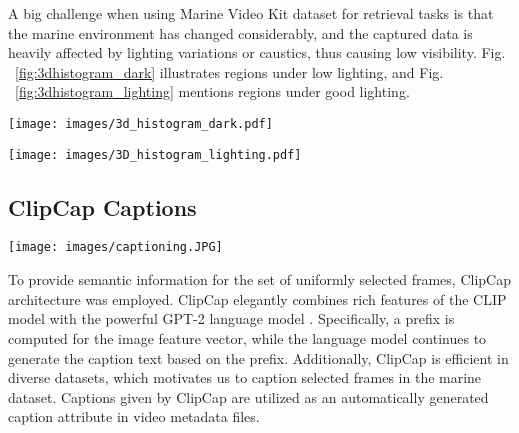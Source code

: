\documentclass[runningheads]{llncs}
\begin{document}
A big challenge when using Marine Video Kit dataset for retrieval tasks is that the marine environment has changed considerably, and the captured data is heavily affected by lighting variations or caustics, thus causing low visibility. Fig. ~\ref{fig:3dhistogram_dark} illustrates regions under low lighting, and Fig. ~\ref{fig:3dhistogram_lighting} mentions regions under good lighting.

\begin{figure*}
\begin{center}
\centering
\texttt{[image: images/3d\_histogram\_dark.pdf]}
\end{center}
  \caption{Illustration of video frame colors present in regions under low illumination using 3D color histograms.}
\label{fig:3dhistogram_dark}
\end{figure*}

\begin{figure*}
\begin{center}
\centering
\texttt{[image: images/3D\_histogram\_lighting.pdf]}
\end{center}
  \caption{Illustration of video frame colors present in regions under good illumination using 3D color histograms.}
\label{fig:3dhistogram_lighting}
\end{figure*}

\subsection{ClipCap Captions}

\begin{figure*}
\begin{center}
\centering
\texttt{[image: images/captioning.JPG]}
\end{center}
  \caption{The captioning architecture. A selected frame is extracted from marine video, then fed into the ClipCap model to output the caption of the selected frame.}
\label{fig:captioning}
\end{figure*}

To provide semantic information for the set of uniformly selected frames, ClipCap \cite{mokady2021clipcap} architecture was employed. ClipCap elegantly combines rich features of the CLIP model \cite{radford2021learning} with the powerful GPT-2 language model \cite{li2021prefix}. Specifically, a prefix is computed for the image feature vector, while the language model continues to generate the caption text based on the prefix. Additionally, ClipCap is efficient in diverse datasets, which motivates us to caption selected frames in the marine dataset. Captions given by ClipCap are utilized as an automatically generated caption attribute in video metadata files.
\end{document}
